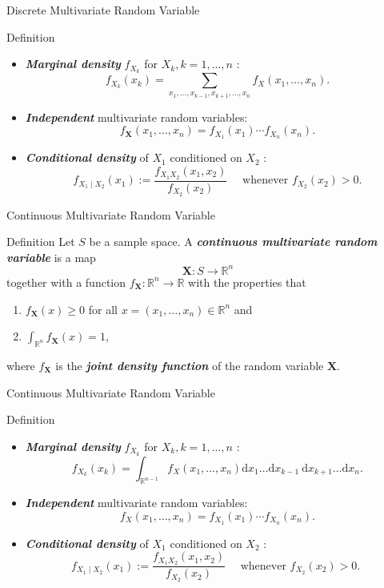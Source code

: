 \documentclass{beamer}
\newcommand{\bb}[1]{\textcolor{antiquefuchsia}{\textbf{\textit{#1}}}}
\begin{document}
\begin{frame}{Discrete Multivariate Random Variable}
\begin{block}{Definition}
\begin{itemize}
\item \bb{Marginal density} $f_{X_{k}}$ for $X_{k}, k=1, \ldots, n$ :
$$
f_{X_{k}}\left(x_{k}\right)=\sum_{x_{1}, \ldots, x_{k-1}, x_{k+1}, \ldots, x_{n}} f_{X}\left(x_{1}, \ldots, x_{n}\right) .
$$
\item \bb{Independent} multivariate random variables:
$$
f_{\mathbf{X}}\left(x_{1}, \ldots, x_{n}\right)=f_{X_{1}}\left(x_{1}\right) \cdots f_{X_{n}}\left(x_{n}\right) .
$$
\item \bb{Conditional density} of $X_{1}$ conditioned on $X_{2}$ :
$$
f_{X_{1} \mid X_{2}}\left(x_{1}\right):=\frac{f_{X_{1} X_{2}}\left(x_{1}, x_{2}\right)}{f_{X_{2}}\left(x_{2}\right)} \quad \text { whenever } f_{X_{2}}\left(x_{2}\right)>0 .
$$
\end{itemize}
\end{block}
\end{frame}

\begin{frame}{Continuous Multivariate Random Variable}
\begin{block}{Definition}
Let $S$ be a sample space. A \bb{continuous multivariate random variable} is a map
$$
\mathbf{X}: S \rightarrow \mathbb{R}^{n}
$$
together with a function $f_{\mathbf{X}}: \mathbb{R}^{n} \rightarrow \mathbb{R}$ with the properties that
\begin{enumerate}
\item $f_{\mathbf{X}}(x) \geq 0$ for all $x=\left(x_{1}, \ldots, x_{n}\right) \in \mathbb{R}^{n}$ and
\item $\int_{\mathbb{R}^{n}} f_{\mathbf{X}}(x)=1$,
\end{enumerate}
where $f_{\mathbf{X}}$ is the \bb{joint density function} of the random variable $\mathbf{X}$.
\end{block}
\end{frame}

\begin{frame}{Continuous Multivariate Random Variable}
\begin{block}{Definition}
\begin{itemize}
\item \bb{Marginal density} $f_{X_{k}}$ for $X_{k}, k=1, \ldots, n$ :
$$
f_{X_{k}}\left(x_{k}\right)=\int_{\mathbb{R}^{n-1}} f_{X}\left(x_{1}, \ldots, x_{n}\right) \mathrm{d} x_{1} \ldots \mathrm{d} x_{k-1} \mathrm{~d} x_{k+1} \ldots \mathrm{d} x_{n} .
$$
\item \bb{Independent} multivariate random variables:
$$
f_{X}\left(x_{1}, \ldots, x_{n}\right)=f_{X_{1}}\left(x_{1}\right) \cdots f_{X_{n}}\left(x_{n}\right) .
$$
\item \bb{Conditional density} of $X_{1}$ conditioned on $X_{2}$ :
$$
f_{X_{1} \mid X_{2}}\left(x_{1}\right):=\frac{f_{X_{1} X_{2}}\left(x_{1}, x_{2}\right)}{f_{X_{2}}\left(x_{2}\right)} \quad \text { whenever } f_{X_{2}}\left(x_{2}\right)>0 \text {. }
$$
\end{itemize}
\end{block}
\end{frame}
\end{document}

